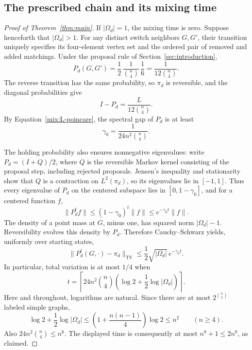 \subsection{The prescribed chain and its mixing time}

\begin{proof}[Proof of Theorem~\ref{thm:main}]
If $|\Omega_d|=1$, the mixing time is zero. Suppose henceforth that
$|\Omega_d|>1$. For any distinct switch neighbors $G,G'$, their transition
uniquely specifies its four-element vertex set and the ordered pair of
removed and added matchings. Under the proposal rule of
Section~\ref{sec:introduction},
\[
P_d(G,G')=\frac12\,\frac1{\binom n4}\,\frac16
=\frac1{12\binom n4}.
\]
The reverse transition has the same probability, so $\pi_d$ is
reversible, and the diagonal probabilities give
\begin{equation}\label{mix:normalization}
I-P_d=\frac{L}{12\binom n4}.
\end{equation}
By Equation~\eqref{mix:L-poincare}, the spectral gap of $P_d$ is at least
\begin{equation}\label{mix:gamma}
\gamma_0=\frac1{24n^2\binom n4}.
\end{equation}

The holding probability also ensures nonnegative eigenvalues: write
$P_d=(I+Q)/2$, where $Q$ is the reversible Markov kernel consisting of
the proposal step, including rejected proposals. Jensen's inequality and
stationarity show that $Q$ is a contraction on $L^2(\pi_d)$, so its
eigenvalues lie in $[-1,1]$. Thus every eigenvalue of $P_d$ on the centered
subspace lies in $[0,1-\gamma_0]$, and for a centered function $f$,
\[
\|P_d^t f\|\le(1-\gamma_0)^t\|f\|
\le e^{-\gamma_0t}\|f\|.
\]
The density of a point mass at $G$, minus one, has squared norm
$|\Omega_d|-1$. Reversibility evolves this density by $P_d$. Therefore
Cauchy--Schwarz yields, uniformly over starting states,
\begin{equation}\label{mix:TV}
\|P_d^t(G,\cdot)-\pi_d\|_{\mathrm{TV}}
\le\frac12\sqrt{|\Omega_d|}\,e^{-\gamma_0t}.
\end{equation}
In particular, total variation is at most $1/4$ when
\[
t=\left\lceil
24n^2\binom n4\left(\log2+\frac12\log|\Omega_d|\right)
\right\rceil.
\]
Here and throughout, logarithms are natural. Since there are at most
$2^{\binom n2}$ labeled simple graphs,
\[
\log2+\frac12\log|\Omega_d|
\le \left(1+\frac{n(n-1)}4\right)\log2\le n^2
\qquad(n\ge4).
\]
Also $24n^2\binom n4\le n^6$. The displayed time is consequently at most
$n^8+1\le2n^8$, as claimed.
\end{proof}

